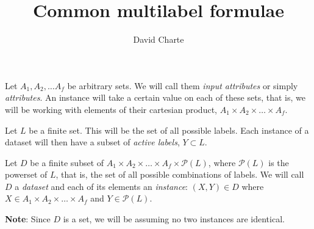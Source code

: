 \documentclass[]{article}
\title{Common multilabel formulae\\\vspace{0.5em}{\large \ldots{}under a common notation}}
\author{David Charte}
\date{}
\begin{document}
\maketitle

Let \(A_1, A_2, \dots A_f\) be arbitrary sets. We will call them
\emph{input attributes} or simply \emph{attributes}. An instance will
take a certain value on each of these sets, that is, we will be working
with elements of their cartesian product,
\(A_1\times A_2\times\dots\times A_f\).

Let \(L\) be a finite set. This will be the set of all possible labels.
Each instance of a dataset will then have a subset of \emph{active
labels}, \(Y \subset L\).

Let \(D\) be a finite subset of
\(A_1\times A_2\times\dots\times A_f\times\mathcal{P}(L)\), where
\(\mathcal{P}(L)\) is the powerset of \(L\), that is, the set of all
possible combinations of labels. We will call \(D\) a \emph{dataset} and
each of its elements an \emph{instance}: \((X, Y)\in D\) where
\(X\in A_1\times A_2\times\dots\times A_f\) and \(Y \in\mathcal{P}(L)\).

\textbf{Note}: Since \(D\) is a set, we will be assuming no two
instances are identical.
\end{document}
